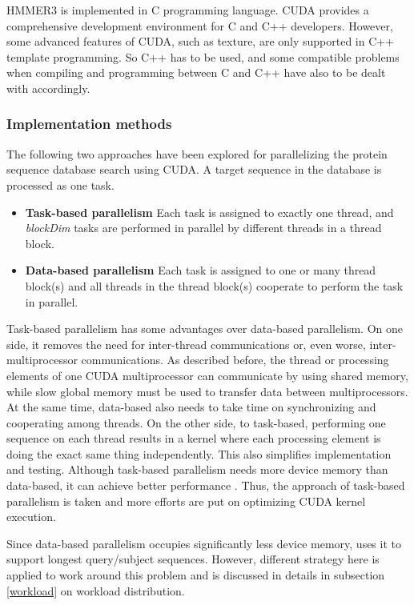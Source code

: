 HMMER3 is implemented in C programming language. CUDA provides a comprehensive development environment for C and C++ developers. However, some advanced features of CUDA, such as texture, are only supported in C++ template programming. So C++ has to be used, and some compatible problems when compiling and programming between C and C++ have also to be dealt with accordingly.

\subsubsection*{Implementation methods}
\label{impl}

The following two approaches have been explored for parallelizing the protein sequence database search using CUDA. A target sequence in the database is processed as one task.

\begin{itemize}
 \item \textbf{Task-based parallelism} Each task is assigned to exactly one thread, and \emph{blockDim} tasks are performed in parallel by different threads in a thread block.
 \item \textbf{Data-based parallelism} Each task is assigned to one or many thread block(s) and all threads in the thread block(s) cooperate to perform the task in parallel.
\end{itemize}

Task-based parallelism has some advantages over data-based parallelism. On one side, it removes the need for inter-thread communications or, even worse, inter-multiprocessor communications. As described before, the thread or processing elements of one CUDA multiprocessor can communicate by using shared memory, while slow global memory must be used to transfer data between multiprocessors. At the same time, data-based also needs to take time on synchronizing and cooperating among threads. On the other side, to task-based, performing one sequence on each thread results in a kernel where each processing element is doing the exact same thing independently. This also simplifies implementation and testing. Although task-based parallelism needs more device memory than data-based, it can achieve better performance \citep{SW++}. Thus, the approach of task-based parallelism is taken and more efforts are put on optimizing CUDA kernel execution.

Since data-based parallelism occupies significantly less device memory, \citep{SW++} uses it to support longest query/subject sequences. However, different strategy here is applied to work around this problem and is discussed in details in subsection \ref{workload} on workload distribution.

